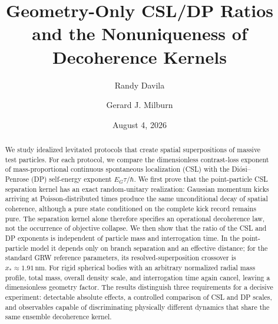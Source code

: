 \documentclass[
  aps,
  prd,
  preprint,
  notitlepage,
  superscriptaddress,
  nofootinbib,
  longbibliography
]{revtex4-2}
\begin{document}
\title{Geometry-Only CSL/DP Ratios and the Nonuniqueness of Decoherence Kernels}

\author{Randy Davila}

\author{Gerard J. Milburn}

\date{August 4, 2026}

\begin{abstract}
We study idealized levitated protocols that create spatial superpositions of massive test particles. For each protocol, we compare the dimensionless contrast-loss exponent of mass-proportional continuous spontaneous localization (CSL) with the Di\'osi--Penrose (DP) self-energy exponent $E_G\tau/\hbar$. We first prove that the point-particle CSL separation kernel has an exact random-unitary realization: Gaussian momentum kicks arriving at Poisson-distributed times produce the same unconditional decay of spatial coherence, although a pure state conditioned on the complete kick record remains pure. The separation kernel alone therefore specifies an operational decoherence law, not the occurrence of objective collapse. We then show that the ratio of the CSL and DP exponents is independent of particle mass and interrogation time. In the point-particle model it depends only on branch separation and an effective distance; for the standard GRW reference parameters, its resolved-superposition crossover is $x_*\approx1.91\,\mathrm{nm}$. For rigid spherical bodies with an arbitrary normalized radial mass profile, total mass, overall density scale, and interrogation time again cancel, leaving a dimensionless geometry factor. The results distinguish three requirements for a decisive experiment: detectable absolute effects, a controlled comparison of CSL and DP scales, and observables capable of discriminating physically different dynamics that share the same ensemble decoherence kernel.
\end{abstract}


\maketitle
\end{document}
